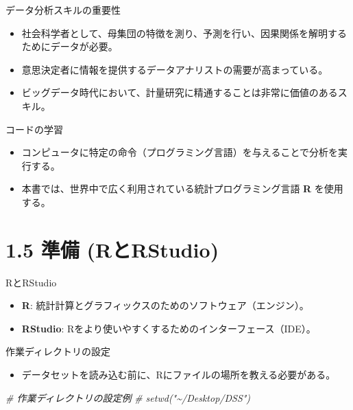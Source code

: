 \documentclass[
  ignorenonframetext,
]{beamer}
\newenvironment{Shaded}{\begin{snugshade}}{\end{snugshade}}
\newcommand{\CommentTok}[1]{\textcolor[rgb]{0.56,0.35,0.01}{\textit{#1}}}
\providecommand{\tightlist}{%
  \setlength{\itemsep}{0pt}\setlength{\parskip}{0pt}}
\begin{document}
\begin{frame}{データ分析スキルの重要性}
\protect\hypertarget{ux30c7ux30fcux30bfux5206ux6790ux30b9ux30adux30ebux306eux91cdux8981ux6027}{}
\begin{itemize}
\tightlist
\item
  社会科学者として、母集団の特徴を測り、予測を行い、因果関係を解明するためにデータが必要。
\item
  意思決定者に情報を提供するデータアナリストの需要が高まっている。
\item
  ビッグデータ時代において、計量研究に精通することは非常に価値のあるスキル。
\end{itemize}
\end{frame}

\begin{frame}{コードの学習}
\protect\hypertarget{ux30b3ux30fcux30c9ux306eux5b66ux7fd2}{}
\begin{itemize}
\tightlist
\item
  コンピュータに特定の命令（プログラミング言語）を与えることで分析を実行する。
\item
  本書では、世界中で広く利用されている統計プログラミング言語 \textbf{R}
  を使用する。
\end{itemize}
\end{frame}

\hypertarget{ux6e96ux5099-rux3068rstudio}{%
\section{1.5 準備 (RとRStudio)}\label{ux6e96ux5099-rux3068rstudio}}

\begin{frame}{RとRStudio}
\protect\hypertarget{rux3068rstudio}{}
\begin{itemize}
\tightlist
\item
  \textbf{R}: 統計計算とグラフィックスのためのソフトウェア（エンジン）。
\item
  \textbf{RStudio}: Rをより使いやすくするためのインターフェース（IDE）。
\end{itemize}
\end{frame}

\begin{frame}[fragile]{作業ディレクトリの設定}
\protect\hypertarget{ux4f5cux696dux30c7ux30a3ux30ecux30afux30c8ux30eaux306eux8a2dux5b9a}{}
\begin{itemize}
\tightlist
\item
  データセットを読み込む前に、Rにファイルの場所を教える必要がある。
\end{itemize}

\begin{Shaded}
\begin{Highlighting}[]
\CommentTok{\# 作業ディレクトリの設定例}
\CommentTok{\# setwd("\textasciitilde{}/Desktop/DSS") }
\end{Highlighting}
\end{Shaded}
\end{frame}
\end{document}
